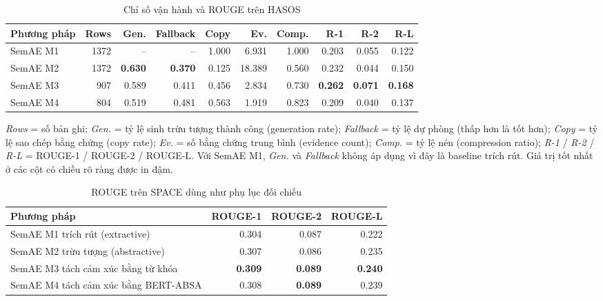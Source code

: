 \begin{table}[H]
\centering
\caption{Chỉ số vận hành và ROUGE trên HASOS}
\label{tab:production-rouge}
\begin{threeparttable}
\small
\begin{tabular}{l r r r r r r r r r}
\toprule
\textbf{Phương pháp} & \textbf{Rows} & \textbf{Gen.} & \textbf{Fallback} & \textbf{Copy} & \textbf{Ev.} & \textbf{Comp.} & \textbf{R-1} & \textbf{R-2} & \textbf{R-L} \\
\midrule
SemAE M1 & 1372 & -- & -- & 1.000 & 6.931 & 1.000 & 0.203 & 0.055 & 0.122 \\
SemAE M2 & 1372 & \textbf{0.630} & \textbf{0.370} & 0.125 & 18.389 & 0.560 & 0.232 & 0.044 & 0.150 \\
SemAE M3 &  907 & 0.589 & 0.411 & 0.456 &  2.834 & 0.730 & \textbf{0.262} & \textbf{0.071} & \textbf{0.168} \\
SemAE M4 &  804 & 0.519 & 0.481 & 0.563 &  1.919 & 0.823 & 0.209 & 0.040 & 0.137 \\
\bottomrule
\end{tabular}
\begin{tablenotes}
\footnotesize
\item \textit{Rows} = số bản ghi; \textit{Gen.} = tỷ lệ sinh trừu tượng thành công (generation rate); \textit{Fallback} = tỷ lệ dự phòng (thấp hơn là tốt hơn); \textit{Copy} = tỷ lệ sao chép bằng chứng (copy rate); \textit{Ev.} = số bằng chứng trung bình (evidence count); \textit{Comp.} = tỷ lệ nén (compression ratio); \textit{R-1} / \textit{R-2} / \textit{R-L} = ROUGE-1 / ROUGE-2 / ROUGE-L. Với SemAE M1, \textit{Gen.} và \textit{Fallback} không áp dụng vì đây là baseline trích rút. Giá trị tốt nhất ở các cột có chiều rõ ràng được in đậm.
\end{tablenotes}
\end{threeparttable}
\end{table}

\begin{table}[H]
\centering
\caption{ROUGE trên SPACE dùng như phụ lục đối chiếu}
\label{tab:space-rouge}
\begin{tabular}{l r r r}
\toprule
\textbf{Phương pháp} & \textbf{ROUGE-1} & \textbf{ROUGE-2} & \textbf{ROUGE-L} \\
\midrule
SemAE M1 trích rút (extractive) & 0.304 & 0.087 & 0.222 \\
SemAE M2 trừu tượng (abstractive) & 0.307 & 0.086 & 0.235 \\
SemAE M3 tách cảm xúc bằng từ khóa & \textbf{0.309} & \textbf{0.089} & \textbf{0.240} \\
SemAE M4 tách cảm xúc bằng BERT-ABSA & 0.308 & \textbf{0.089} & 0.239 \\
\bottomrule
\end{tabular}
\end{table}

